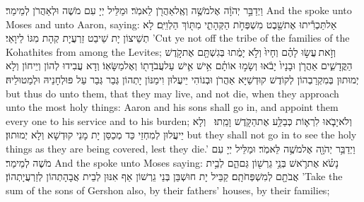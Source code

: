 {וַיְדַבֵּ֣ר יְהֹוָ֔ה אֶל\maqqaf מֹשֶׁ֥ה וְאֶֽל\maqqaf אַהֲרֹ֖ן לֵאמֹֽר׃}
{וּמַלֵּיל יְיָ עִם מֹשֶׁה וּלְאַהֲרֹן לְמֵימַר׃}
{And the \lord\space spoke unto Moses and unto Aaron, saying:}{}
{אַל\maqqaf תַּכְרִ֕יתוּ אֶת\maqqaf שֵׁ֖בֶט מִשְׁפְּחֹ֣ת הַקְּהָתִ֑י מִתּ֖וֹךְ הַלְוִיִּֽם׃}
{לָא תְשֵׁיצוֹן יָת שֵׁיבַט זַרְעֲיָת קְהָת מִגּוֹ לֵיוָאֵי׃}
{’Cut ye not off the tribe of the families of the Kohathites from among the Levites;}{}
{וְזֹ֣את \legarmeh  עֲשׂ֣וּ לָהֶ֗ם וְחָיוּ֙ וְלֹ֣א יָמֻ֔תוּ בְּגִשְׁתָּ֖ם אֶת\maqqaf קֹ֣דֶשׁ הַקֳּדָשִׁ֑ים אַהֲרֹ֤ן וּבָנָיו֙ יָבֹ֔אוּ וְשָׂמ֣וּ אוֹתָ֗ם אִ֥ישׁ אִ֛ישׁ עַל\maqqaf עֲבֹדָת֖וֹ וְאֶל\maqqaf מַשָּׂאֽוֹ׃}
{וְדָא עֲבִידוּ לְהוֹן וְיֵיחוֹן וְלָא יְמוּתוּן בְּמִקְרַבְהוֹן לְקוֹדֶשׁ קוּדְשַׁיָּא אַהֲרֹן וּבְנוֹהִי יֵיעֲלוּן וִימַנּוֹן יָתְהוֹן גְּבַר גְּבַר עַל פּוּלְחָנֵיהּ וּלְמַטוּלֵיהּ׃}
{but thus do unto them, that they may live, and not die, when they approach unto the most holy things: Aaron and his sons shall go in, and appoint them every one to his service and to his burden;}{}
{וְלֹא\maqqaf יָבֹ֧אוּ לִרְא֛וֹת כְּבַלַּ֥ע אֶת\maqqaf הַקֹּ֖דֶשׁ וָמֵֽתוּ׃ \petucha }
{וְלָא יֵיעֲלוּן לְמִחְזֵי כַּד מְכַסַּן יָת מָנֵי קוּדְשָׁא וְלָא יְמוּתוּן׃}
{but they shall not go in to see the holy things as they are being covered, lest they die.’}{}
{וַיְדַבֵּ֥ר יְהֹוָ֖ה אֶל\maqqaf מֹשֶׁ֥ה לֵּאמֹֽר׃}
{וּמַלֵּיל יְיָ עִם מֹשֶׁה לְמֵימַר׃}
{And the \lord\space spoke unto Moses saying:}{}
{נָשֹׂ֗א אֶת\maqqaf רֹ֛אשׁ בְּנֵ֥י גֵרְשׁ֖וֹן גַּם\maqqaf הֵ֑ם לְבֵ֥ית אֲבֹתָ֖ם לְמִשְׁפְּחֹתָֽם׃}
{קַבֵּיל יָת חוּשְׁבַּן בְּנֵי גֵרְשׁוֹן אַף אִנּוּן לְבֵית אֲבָהָתְהוֹן לְזַרְעֲיָתְהוֹן׃}
{’Take the sum of the sons of Gershon also, by their fathers’ houses, by their families;}{}
